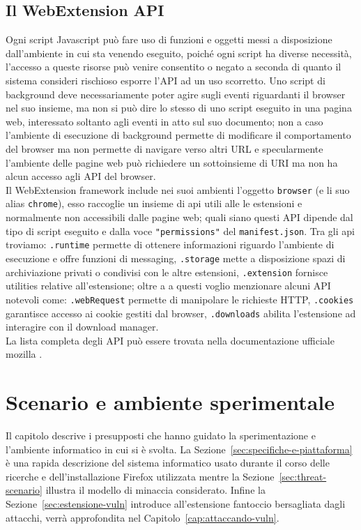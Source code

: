 \documentclass{sapthesis}
\newcommand{\code}[1]{\texttt{#1}}
\newcommand{\attr}[1]{\code{.#1}}
\newcommand{\Sezione}[1]{Sezione~\ref{#1}}
\newcommand{\Capitolo}[1]{Capitolo~\ref{#1}}
\newcommand{\JS}{Javascript}
\newcommand{\manifest}{\code{manifest.json}}
\begin{document}
    \section{Il WebExtension API}
    \label{sec:webextension-api}
        Ogni script \JS{} può fare uso di funzioni e oggetti messi a disposizione dall'ambiente in cui sta venendo
        eseguito, poiché ogni script ha diverse necessità, l'accesso a queste risorse può venire consentito o negato
        a seconda di quanto il sistema consideri rischioso esporre l'API ad un uso scorretto. Uno script di background
        deve necessariamente poter agire sugli eventi riguardanti il browser nel suo insieme, ma non si può dire lo
        stesso di uno script eseguito in una pagina web, interessato soltanto agli eventi in atto sul suo documento;
        non a caso l'ambiente di esecuzione di background permette di modificare il comportamento del
        browser ma non permette di navigare verso altri URL e specularmente l'ambiente delle pagine web può
        richiedere un sottoinsieme di URI ma non ha alcun accesso agli API del browser.\\
        Il WebExtension framework include nei suoi ambienti l'oggetto \code{browser} (e li suo alias \code{chrome}),
        esso raccoglie un insieme di api utili alle le estensioni e normalmente non accessibili dalle pagine web;
        quali siano questi API dipende dal tipo di script eseguito e dalla voce \code{"permissions"} del \manifest{}.
        Tra gli api troviamo: \attr{runtime} permette di ottenere informazioni riguardo l'ambiente di 
        esecuzione e offre funzioni di messaging, \attr{storage} mette a disposizione spazi di archiviazione privati
        o condivisi con le altre estensioni, \attr{extension} fornisce utilities relative all'estensione; oltre a
        a questi voglio menzionare alcuni API notevoli come: \attr{webRequest} permette di manipolare le richieste HTTP, 
        \attr{cookies} garantisce accesso ai cookie gestiti dal browser, \attr{downloads}
        abilita l'estensione ad interagire con il download manager. \\
        La lista completa degli API può essere trovata nella documentazione ufficiale mozilla \cite{browser-webextension-api}.
    

\chapter{Scenario e ambiente sperimentale}
\label{cap:scenario-e-ambiente}
    Il capitolo descrive i presupposti che hanno guidato la sperimentazione e l'ambiente
    informatico in cui si è svolta. La \Sezione{sec:specifiche-e-piattaforma} è una rapida descrizione
    del sistema informatico usato durante il corso delle ricerche e dell'installazione
    Firefox utilizzata mentre la \Sezione{sec:threat-scenario} illustra il modello di minaccia
    considerato. Infine la \Sezione{sec:estensione-vuln} introduce all'estensione fantoccio 
    bersagliata dagli attacchi, verrà approfondita nel \Capitolo{cap:attaccando-vuln}.
\end{document}

